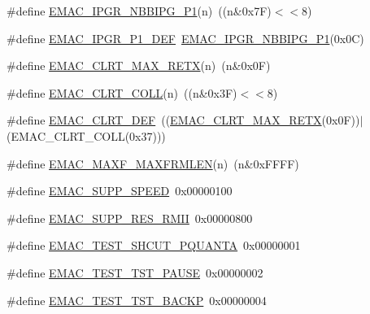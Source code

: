 \begin{DoxyCompactItemize}
\item 
\#define \hyperlink{group___e_m_a_c___private___macros_gacbb57ef1dc7ae7157313034809943dca}{\-E\-M\-A\-C\-\_\-\-I\-P\-G\-R\-\_\-\-N\-B\-B\-I\-P\-G\-\_\-\-P1}(n)~((n\&0x7\-F)$<$$<$8)
\item 
\#define \hyperlink{group___e_m_a_c___private___macros_ga91104ac19bcd33a9008dc0821eb8c62f}{\-E\-M\-A\-C\-\_\-\-I\-P\-G\-R\-\_\-\-P1\-\_\-\-D\-E\-F}~\hyperlink{group___e_m_a_c___private___macros_gacbb57ef1dc7ae7157313034809943dca}{\-E\-M\-A\-C\-\_\-\-I\-P\-G\-R\-\_\-\-N\-B\-B\-I\-P\-G\-\_\-\-P1}(0x0\-C)
\item 
\#define \hyperlink{group___e_m_a_c___private___macros_ga80561bd2eefb2565cb61dd9776b971e9}{\-E\-M\-A\-C\-\_\-\-C\-L\-R\-T\-\_\-\-M\-A\-X\-\_\-\-R\-E\-T\-X}(n)~(n\&0x0\-F)
\item 
\#define \hyperlink{group___e_m_a_c___private___macros_ga31909d1189510bb78c366a57b7dd8b11}{\-E\-M\-A\-C\-\_\-\-C\-L\-R\-T\-\_\-\-C\-O\-L\-L}(n)~((n\&0x3\-F)$<$$<$8)
\item 
\#define \hyperlink{group___e_m_a_c___private___macros_ga9dd9d0e0636b30ba30f807739162cb03}{\-E\-M\-A\-C\-\_\-\-C\-L\-R\-T\-\_\-\-D\-E\-F}~((\hyperlink{group___e_m_a_c___private___macros_ga80561bd2eefb2565cb61dd9776b971e9}{\-E\-M\-A\-C\-\_\-\-C\-L\-R\-T\-\_\-\-M\-A\-X\-\_\-\-R\-E\-T\-X}(0x0\-F))$|$(\-E\-M\-A\-C\-\_\-\-C\-L\-R\-T\-\_\-\-C\-O\-L\-L(0x37)))
\item 
\#define \hyperlink{group___e_m_a_c___private___macros_ga90bf34a3a75eeaed24f3dcac30de5f76}{\-E\-M\-A\-C\-\_\-\-M\-A\-X\-F\-\_\-\-M\-A\-X\-F\-R\-M\-L\-E\-N}(n)~(n\&0x\-F\-F\-F\-F)
\item 
\#define \hyperlink{group___e_m_a_c___private___macros_gad2ecdc63e97958e95d6e6ac7a98492b7}{\-E\-M\-A\-C\-\_\-\-S\-U\-P\-P\-\_\-\-S\-P\-E\-E\-D}~0x00000100
\item 
\#define \hyperlink{group___e_m_a_c___private___macros_ga066831afd0fdf3c508522604e6c1922d}{\-E\-M\-A\-C\-\_\-\-S\-U\-P\-P\-\_\-\-R\-E\-S\-\_\-\-R\-M\-I\-I}~0x00000800
\item 
\#define \hyperlink{group___e_m_a_c___private___macros_gae01ee924918e9bf3431375a57b52bd6b}{\-E\-M\-A\-C\-\_\-\-T\-E\-S\-T\-\_\-\-S\-H\-C\-U\-T\-\_\-\-P\-Q\-U\-A\-N\-T\-A}~0x00000001
\item 
\#define \hyperlink{group___e_m_a_c___private___macros_ga316fe4c249bb86db131f82f593f4eb05}{\-E\-M\-A\-C\-\_\-\-T\-E\-S\-T\-\_\-\-T\-S\-T\-\_\-\-P\-A\-U\-S\-E}~0x00000002
\item 
\#define \hyperlink{group___e_m_a_c___private___macros_ga66213b05bdd6b9017b8f29d2789ab79d}{\-E\-M\-A\-C\-\_\-\-T\-E\-S\-T\-\_\-\-T\-S\-T\-\_\-\-B\-A\-C\-K\-P}~0x00000004

\end{DoxyCompactItemize}
